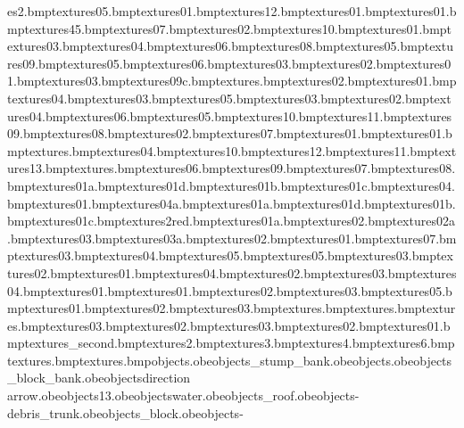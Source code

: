 es\frozentreats2.bmp textures\sdomestripblu05.bmp textures\sdomestrip01.bmp textures\snowbeam12.bmp textures\snowbeam01.bmp textures\snowxmasdoor01.bmp textures\snowturf45.bmp textures\snowindow07.bmp textures\snowindow02.bmp textures\snowindow10.bmp textures\snowindow01.bmp textures\snowindow03.bmp textures\snowindow04.bmp textures\snowindow06.bmp textures\snowindow08.bmp textures\snowindow05.bmp textures\snowindow09.bmp textures\snowbeam05.bmp textures\snowbeam06.bmp textures\snowpole03.bmp textures\snowpole02.bmp textures\snowpole01.bmp textures\sdomestrip03.bmp textures\snowturf09c.bmp textures\americanfootball.bmp textures\icecubed02.bmp textures\icecubed01.bmp textures\icecubed04.bmp textures\icecubed03.bmp textures\icecubed05.bmp textures\snowboat03.bmp textures\snowboat02.bmp textures\snowboat04.bmp textures\snowboat06.bmp textures\snowboat05.bmp textures\snowboat10.bmp textures\snowboat11.bmp textures\snowboat09.bmp textures\snowboat08.bmp textures\sign02.bmp textures\snowboat07.bmp textures\snowboat01.bmp textures\snowbulbs01.bmp textures\safariwater.bmp textures\snowpud04.bmp textures\snowpud10.bmp textures\snowpud12.bmp textures\snowpud11.bmp textures\snowpud13.bmp textures\palmbark.bmp textures\snowpud06.bmp textures\snowpud09.bmp textures\snowpud07.bmp textures\snowpud08.bmp textures\snowplantice01a.bmp textures\snowplantice01d.bmp textures\snowplantice01b.bmp textures\snowplantice01c.bmp textures\xmaspressie04.bmp textures\xmaspressie01.bmp textures\xmaspressie04a.bmp textures\snowplantpurp01a.bmp textures\snowplantpurp01d.bmp textures\snowplantpurp01b.bmp textures\snowplantpurp01c.bmp textures\trunkend2red.bmp textures\xmaspressie01a.bmp textures\xmaspressie02.bmp textures\xmaspressie02a.bmp textures\xmaspressie03.bmp textures\xmaspressie03a.bmp textures\snowxmas02.bmp textures\snowxmas01.bmp textures\snowxmas07.bmp textures\snowxmas03.bmp textures\snowxmas04.bmp textures\snowxmas05.bmp textures\bluetree05.bmp textures\bluetree03.bmp textures\bluetree02.bmp textures\bluetree01.bmp textures\bluetree04.bmp textures\purptree02.bmp textures\purptree03.bmp textures\purptree04.bmp textures\purptree01.bmp textures\snowpud01.bmp textures\snowpud02.bmp textures\snowpud03.bmp textures\snowpud05.bmp textures\igloo01.bmp textures\igloo02.bmp textures\igloo03.bmp textures\snowtree.bmp textures\rocketstripes.bmp textures\rocketlogo.bmp textures\snowbox03.bmp textures\snowbox02.bmp textures\cheesemousecrate03.bmp textures\cheesemousecrate02.bmp textures\snowbox01.bmp textures\kingdome_second.bmp textures\clothes2.bmp textures\clothes3.bmp textures\clothes4.bmp textures\clothes6.bmp textures\dice.bmp textures\domino.bmp objects\motion.obe objects\roundtree_stump_bank.obe objects\main.obe objects\cave_block_bank.obe objects\multi direction arrow.obe objects\snow13.obe objects\middle water.obe objects\slippy_roof.obe objects\bank - debris_trunk.obe objects\sheild_block.obe objects\bank - 